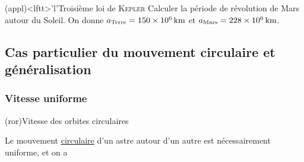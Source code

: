 \documentclass[../../main/main.tex]{subfiles}
\begin{document}
\begin{tcb*}(appl)<lftt>'l'{Troisième loi de \textsc{Kepler}}
	Calculer la période de révolution de Mars autour du Soleil. On donne $a_{\rm
				Terre} = \SI{150e6}{km}$ et $a_{\rm Mars} = \SI{228e6}{km}$.
	\tcblower
	\vspace{-30pt}
\end{tcb*}

\subsection{Cas particulier du mouvement circulaire et généralisation}
\subsubsection{Vitesse uniforme}
\begin{tcb*}[sidebyside, righthand ratio=.35](ror){Vitesse des orbites
			circulaires}
	\begin{bfseries}
		Le mouvement \ul{circulaire} d'un astre autour d'un autre
		est nécessairement uniforme, et on a
	\end{bfseries}
	\tcblower
	\psw{\[\boxed{v\ind{cercle} = \sqrt{\frac{\Gc M_S}{R}}}\]}
\end{tcb*}
\end{document}
